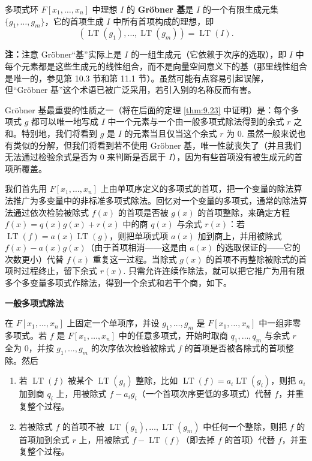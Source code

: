 \begin{definition}
多项式环 \(F[x_1, \ldots, x_n]\) 中理想 \(I\) 的 \textbf{Gröbner 基}是 \(I\) 的一个有限生成元集 \(\{g_1, \ldots, g_m\}\)，它的首项生成 \(I\) 中所有首项构成的理想，即
\[
(\operatorname{LT}(g_1), \ldots, \operatorname{LT}(g_m)) = \operatorname{LT}(I).
\]
\end{definition}

\noindent\textbf{注：}注意 Gröbner“基”实际上是 \(I\) 的一组生成元（它依赖于次序的选取），即 \(I\) 中每个元素都是这些生成元的线性组合，而不是向量空间意义下的基（那里线性组合是唯一的，参见第 10.3 节和第 11.1 节）。虽然可能有点容易引起误解，但“Gröbner 基”这个术语已被广泛采用，若引入别的名称反而有害。

Gröbner 基最重要的性质之一（将在后面的定理 \ref{thm:9.23} 中证明）是：每个多项式 \(g\) 都可以唯一地写成 \(I\) 中一个元素与一个由一般多项式除法得到的余式 \(r\) 之和。特别地，我们将看到 \(g\) 是 \(I\) 的元素当且仅当这个余式 \(r\) 为 0. 虽然一般来说也有类似的分解，但我们将看到若不使用 Gröbner 基，唯一性就丧失了（并且我们无法通过检验余式是否为 0 来判断是否属于 \(I\)），因为有些首项没有被生成元的首项所覆盖。

我们首先用 \(F[x_1, \ldots, x_n]\) 上由单项序定义的多项式的首项，把一个变量的除法算法推广为多变量中的非标准多项式除法。回忆对一个变量的多项式，通常的除法算法通过依次检验被除式 \(f(x)\) 的首项是否被 \(g(x)\) 的首项整除，来确定方程 \(f(x) = q(x)g(x)+r(x)\) 中的商 \(q(x)\) 与余式 \(r(x)\)：若 \(\operatorname{LT}(f) = a(x)\operatorname{LT}(g)\)，则把单项式项 \(a(x)\) 加到商上，并用被除式 \(f(x)-a(x)g(x)\)（由于首项相消——这是由 \(a(x)\) 的选取保证的——它的次数更小）代替 \(f(x)\) 重复这一过程。当除式 \(g(x)\) 的首项不再整除被除式的首项时过程终止，留下余式 \(r(x)\). 只需允许连续作除法，就可以把它推广为用有限多个多变量多项式作除法，得到一个余式和若干个商，如下。

\noindent\textbf{一般多项式除法}

在 \(F[x_1, \ldots, x_n]\) 上固定一个单项序，并设 \(g_1, \ldots, g_m\) 是 \(F[x_1, \ldots, x_n]\) 中一组非零多项式。若 \(f\) 是 \(F[x_1, \ldots, x_n]\) 中的任意多项式，开始时取商 \(q_1, \ldots, q_m\) 与余式 \(r\) 全为 0，并按 \(g_1, \ldots, g_m\) 的次序依次检验被除式 \(f\) 的首项是否被各除式的首项整除。然后

\begin{enumerate}
\item[(i)] 若 \(\operatorname{LT}(f)\) 被某个 \(\operatorname{LT}(g_i)\) 整除，比如 \(\operatorname{LT}(f) = a_i\operatorname{LT}(g_i)\)，则把 \(a_i\) 加到商 \(q_i\) 上，用被除式 \(f-a_ig_i\)（一个首项次序更低的多项式）代替 \(f\)，并重复整个过程。

\item[(ii)] 若被除式 \(f\) 的首项不被 \(\operatorname{LT}(g_1), \ldots, \operatorname{LT}(g_m)\) 中任何一个整除，则把 \(f\) 的首项加到余式 \(r\) 上，用被除式 \(f-\operatorname{LT}(f)\)（即去掉 \(f\) 的首项）代替 \(f\)，并重复整个过程。
\end{enumerate}

